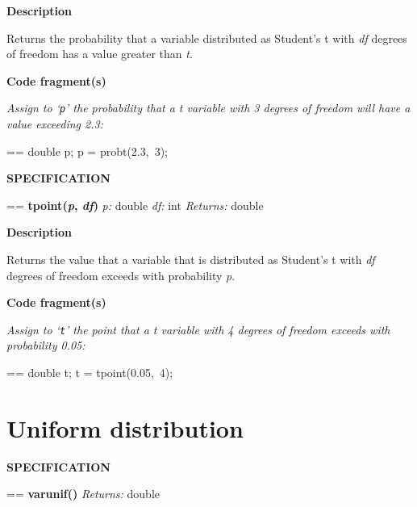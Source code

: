 \documentclass{book}
\makeatletter
\newcommand\Texinfocommandstyletextvar[1]{{\normalfont{}\textsl{#1}}}%
\newenvironment{Texinfopreformatted}{%
  \par\GNUTobeylines\obeyspaces\frenchspacing\parskip=\z@\parindent=\z@}{}
{\catcode`\^^M=13 \gdef\GNUTobeylines{\catcode`\^^M=13 \def^^M{\null\par}}}
\newenvironment{Texinfoindented}{\begin{list}{}{}\item\relax}{\end{list}}
\renewcommand{\_}{\Texinfounderscore\discretionary{}{}{}}
\makeatother
\begin{document}
\noindent{}\textbf{Description}

Returns the probability that a variable distributed as Student's t with
\Texinfocommandstyletextvar{df} degrees of freedom has a value greater than \Texinfocommandstyletextvar{t}.

\noindent{}\textbf{Code fragment(s)}

\emph{Assign to `\texttt{p}' the probability that a t variable with 3
degrees of freedom will have a value exceeding 2.3:}
\begin{Texinfoindented}
\begin{Texinfopreformatted}%
\ttfamily double p;
p = probt(2.3,\ 3);
\end{Texinfopreformatted}
\end{Texinfoindented}

\noindent{}\textbf{SPECIFICATION}
\begin{Texinfoindented}
\begin{Texinfopreformatted}%
\textbf{tpoint(\Texinfocommandstyletextvar{p}, \Texinfocommandstyletextvar{df})}
\Texinfocommandstyletextvar{p:} double
\Texinfocommandstyletextvar{df:} int
\Texinfocommandstyletextvar{Returns:} double
\end{Texinfopreformatted}
\end{Texinfoindented}

\noindent{}\textbf{Description}

Returns the value that a variable that is distributed as Student's t with
\Texinfocommandstyletextvar{df} degrees of freedom exceeds with probability \Texinfocommandstyletextvar{p}.

\noindent{}\textbf{Code fragment(s)}

\emph{Assign to `\texttt{t}' the point
that a t variable with 4 degrees of freedom
exceeds with probability 0.05:}
\begin{Texinfoindented}
\begin{Texinfopreformatted}%
\ttfamily double t;
t = tpoint(0.05,\ 4);
\end{Texinfopreformatted}
\end{Texinfoindented}

\section{{Uniform distribution}}
\label{anchor:Uniform-distribution}%
%
%

\noindent{}\textbf{SPECIFICATION}
\begin{Texinfoindented}
\begin{Texinfopreformatted}%
\textbf{varunif()}
\Texinfocommandstyletextvar{Returns:} double
\end{Texinfopreformatted}
\end{Texinfoindented}
\end{document}
